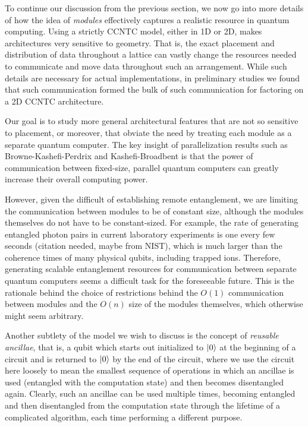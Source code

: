 \documentclass{article}
\begin{document}
To continue our discussion from the previous section, we now go into more
details of how the idea of \emph{modules} effectively captures a realistic
resource in quantum computing. Using a strictly CCNTC model, either in 1D
or 2D, makes architectures very sensitive to geometry. That is, the exact
placement and distribution of data throughout a lattice can vastly change
the resources needed to communicate and move data throughout such an
arrangement. While such details are necessary for actual implementations,
in preliminary studies we found that such communication formed the bulk of
such communication for factoring on a 2D CCNTC architecture.

Our goal is to study more general architectural features that are not so
sensitive to placement, or moreover, that obviate the need by treating
each module as a separate quantum computer. The key insight of
parallelization results such as Browne-Kashefi-Perdrix and
Kashefi-Broadbent is that the power of communication between fixed-size,
parallel quantum computers can greatly increase their overall computing
power.

However, given the difficult of establishing remote entanglement, we
are limiting the communication between modules to be of constant size,
although the modules themselves do not have to be constant-sized. For example,
the rate of generating entangled photon pairs in current laboratory
experiments is one every few seconds (citation needed, maybe from NIST),
which is much larger than the coherence times of many physical qubits,
including trapped ions. Therefore, generating scalable entanglement resources
for communication between separate quantum computers seems a difficult task
for the foreseeable future. This is the rationale behind the choice of
restrictions behind the $O(1)$ communication between modules and the
$O(n)$ size of the modules themselves, which otherwise might seem
arbitrary.

Another subtlety of the model we wish to discuss is the concept of
\emph{reusable ancillae}, that is, a qubit which starts out initialized to
$\left\vert{0}\right\rangle$ at the beginning of a circuit and is returned to $\left\vert{0}\right\rangle$ by the
end of the circuit, where we use the circuit here loosely to mean the
smallest sequence of operations in which an ancillae is used
(entangled with the computation state) and then becomes disentangled again.
Clearly, such an ancillae can be used multiple times, becoming entangled
and then disentangled from the computation state through the lifetime of a
complicated algorithm, each time performing a different purpose.
\end{document}
